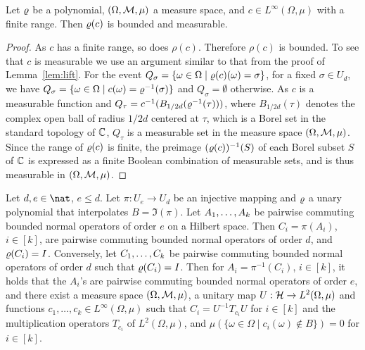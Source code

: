 \documentclass[11pt,letter]{article}
\begin{document}
\begin{lemma}\label{lem:polynomial-image}
Let $\varrho$ be a polynomial, $(\Omega,{\mathcal M},\mu)$ a measure space, and $c\in L^\infty(\Omega,\mu)$ with a finite range. Then $\varrho(c)$ is bounded and measurable.
\end{lemma}

\begin{proof}
As $c$ has a finite range, so does $\rho(c)$. Therefore $\rho(c)$ is bounded. To
see that $c$ is measurable we use an argument similar to that from the proof
of Lemma~\ref{lem:lift}. For the event $Q_\sigma = \{\omega\in\Omega\mid
  \varrho(c)(\omega) =\sigma\}$, for a fixed $\sigma\in U_d$,
we have $Q_\sigma = \{\omega\in\Omega\mid c(\omega) =\varrho^{-1}(\sigma)\}$ and $Q_\sigma=\emptyset$ otherwise. As $c$ is a measurable function and $Q_\tau = c^{-1}(B_{1/2d}(\varrho^{-1}(\tau)))$, where $B_{1/2d}(\tau)$ denotes the complex open ball of radius $1/2d$ centered
at $\tau$, which is a Borel set in the standard topology of ${\mathbb C}$, $Q_\tau$ is a measurable set in the measure space $(\Omega,{\mathcal M},\mu)$. Since the range of $\varrho(c)$ is finite, the preimage $(\varrho(c))^{-1}(S)$ of each Borel subset $S$ of ${\mathbb C}$ is expressed as a finite Boolean combination of measurable sets, and is thus measurable in $(\Omega,{\mathcal M},\mu)$.
\end{proof}

\begin{lemma}\label{lem:mapping-infinite}
Let $d,e\in\nat$, $e\le d$. 
Let $\pi:U_e\to U_d$ be an injective mapping and $\varrho$ a unary polynomial that interpolates $B=\Im(\pi)$.  Let $A _1,\ldots, A _{k}$ be pairwise commuting bounded normal operators of order $e$ on a Hilbert space. Then $C_i=\pi(A_i)$, $i\in[k]$, are pairwise commuting bounded normal operators of order $d$, and $\varrho(C_i)=I$. Conversely, let $C _1,\ldots, C _{k}$ be pairwise commuting bounded normal operators of order $d$ such that $\varrho(C_i)=I$. Then for $A_i=\pi^{-1}(C_i)$, $i\in[k]$, it holds that the $A_i$'s are pairwise commuting bounded normal operators of order $e$, and there exist a measure space $(\Omega,{\mathcal M},\mu)$, a unitary map $U:{\mathcal H}\to L^2(\Omega,\mu)$ and functions $c_1,\dots,c_k\in L^\infty(\Omega,\mu)$ such that $C_i = U^{-1} T_{c_i}U$ for $i\in [k]$ and the multiplication operators $T_{c_i}$ of $L^2(\Omega,\mu)$, and $\mu(\{\omega\in\Omega\mid c_i(\omega)\not\in B\}) = 0$ for $i\in[k]$.
\end{lemma}
\end{document}
